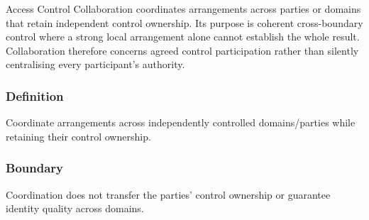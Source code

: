 Access Control Collaboration coordinates arrangements across parties or domains that retain independent control ownership. Its purpose is coherent cross-boundary control where a strong local arrangement alone cannot establish the whole result. Collaboration therefore concerns agreed control participation rather than silently centralising every participant's authority.

\subsubsection*{Definition}

Coordinate arrangements across independently controlled domains/\allowbreak{}parties while retaining their control ownership.

\subsubsection*{Boundary}

Coordination does not transfer the parties' control ownership or guarantee identity quality across domains.

